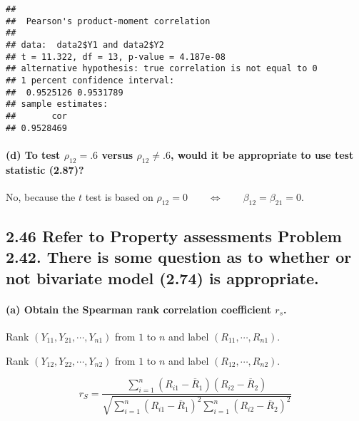 \documentclass[]{article}
\newenvironment{Shaded}{\begin{snugshade}}{\end{snugshade}}
\newcommand{\KeywordTok}[1]{\textcolor[rgb]{0.13,0.29,0.53}{\textbf{#1}}}
\newcommand{\DataTypeTok}[1]{\textcolor[rgb]{0.13,0.29,0.53}{#1}}
\newcommand{\StringTok}[1]{\textcolor[rgb]{0.31,0.60,0.02}{#1}}
\newcommand{\OperatorTok}[1]{\textcolor[rgb]{0.81,0.36,0.00}{\textbf{#1}}}
\newcommand{\NormalTok}[1]{#1}
\let\oldparagraph\paragraph
\renewcommand{\paragraph}[1]{\oldparagraph{#1}\mbox{}}
\begin{document}
\begin{verbatim}
## 
##  Pearson's product-moment correlation
## 
## data:  data2$Y1 and data2$Y2
## t = 11.322, df = 13, p-value = 4.187e-08
## alternative hypothesis: true correlation is not equal to 0
## 1 percent confidence interval:
##  0.9525126 0.9531789
## sample estimates:
##       cor 
## 0.9528469
\end{verbatim}

\paragraph{\texorpdfstring{(d) To test \(\rho_{12}= .6\) versus
\(\rho_{12}\neq.6\), would it be appropriate to use test statistic
(2.87)?}{(d) To test \textbackslash{}rho\_\{12\}= .6 versus \textbackslash{}rho\_\{12\}\textbackslash{}neq.6, would it be appropriate to use test statistic (2.87)?}}\label{d-to-test-rho_12-.6-versus-rho_12neq.6-would-it-be-appropriate-to-use-test-statistic-2.87}

No, because the \(t\) test is based on
\(\rho_{12}=0\qquad\Longleftrightarrow\qquad \beta_{12}=\beta_{21}=0\).

\subsection{2.46 Refer to Property assessments Problem 2.42. There is
some question as to whether or not bivariate model (2.74) is
appropriate.}\label{refer-to-property-assessments-problem-2.42.-there-is-some-question-as-to-whether-or-not-bivariate-model-2.74-is-appropriate.}

\paragraph{\texorpdfstring{(a) Obtain the Spearman rank correlation
coefficient
\(r_s\).}{(a) Obtain the Spearman rank correlation coefficient r\_s.}}\label{a-obtain-the-spearman-rank-correlation-coefficient-r_s.}

Rank \((Y_{11},Y_{21},\cdots,Y_{n1})\) from \(1\) to \(n\) and label
\((R_{11},\cdots,R_{n1}).\)

Rank \((Y_{12},Y_{22},\cdots,Y_{n2})\) from \(1\) to \(n\) and label
\((R_{12},\cdots,R_{n2}).\)

\[r_S=\dfrac{\sum\limits_{i=1}^n(R_{i1}-\overline{R}_1)(R_{i2}-\overline{R}_2)}{\sqrt{\sum\limits_{i=1}^n(R_{i1}-\overline{R}_1)^2\sum\limits_{i=1}^n(R_{i2}-\overline{R}_2)^2}}\]

\begin{Shaded}
\end{Shaded}
\end{document}
